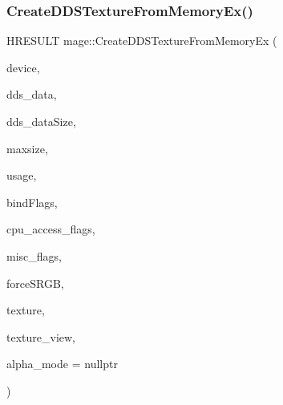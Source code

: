\hypertarget{namespacemage_a722f410006184b6dbc8267a309432be4}{}\label{namespacemage_a722f410006184b6dbc8267a309432be4} 
\subsubsection{\texorpdfstring{Create\+D\+D\+S\+Texture\+From\+Memory\+Ex()}{CreateDDSTextureFromMemoryEx()}\hspace{0.1cm}{\footnotesize\ttfamily [1/4]}}
{\footnotesize\ttfamily H\+R\+E\+S\+U\+LT mage\+::\+Create\+D\+D\+S\+Texture\+From\+Memory\+Ex (\begin{DoxyParamCaption}\item[{\+\_\+\+In\+\_\+ \hyperlink{namespacemage_ae74f374780900893caa5555d1031fd79}{Com\+Ptr}$<$ I\+D3\+D11\+Device2 $>$}]{device,  }\item[{\+\_\+\+In\+\_\+reads\+\_\+bytes\+\_\+(dds\+\_\+data\+Size) const uint8\+\_\+t $\ast$}]{dds\+\_\+data,  }\item[{\+\_\+\+In\+\_\+ size\+\_\+t}]{dds\+\_\+data\+Size,  }\item[{\+\_\+\+In\+\_\+ size\+\_\+t}]{maxsize,  }\item[{\+\_\+\+In\+\_\+ D3\+D11\+\_\+\+U\+S\+A\+GE}]{usage,  }\item[{\+\_\+\+In\+\_\+ uint32\+\_\+t}]{bind\+Flags,  }\item[{\+\_\+\+In\+\_\+ uint32\+\_\+t}]{cpu\+\_\+access\+\_\+flags,  }\item[{\+\_\+\+In\+\_\+ uint32\+\_\+t}]{misc\+\_\+flags,  }\item[{\+\_\+\+In\+\_\+ bool}]{force\+S\+R\+GB,  }\item[{\+\_\+\+Outptr\+\_\+opt\+\_\+ I\+D3\+D11\+Resource $\ast$$\ast$}]{texture,  }\item[{\+\_\+\+Outptr\+\_\+opt\+\_\+ I\+D3\+D11\+Shader\+Resource\+View $\ast$$\ast$}]{texture\+\_\+view,  }\item[{\+\_\+\+Out\+\_\+opt\+\_\+ \hyperlink{namespacemage_a0c586a2bad862f4858900ca121ca80c2}{D\+D\+S\+\_\+\+A\+L\+P\+H\+A\+\_\+\+M\+O\+DE} $\ast$}]{alpha\+\_\+mode = {\ttfamily nullptr} }\end{DoxyParamCaption})}

\hypertarget{namespacemage_ad9f3edfa9ac87c7273ba0e5eab893e5a}{}\label{namespacemage_ad9f3edfa9ac87c7273ba0e5eab893e5a} 
